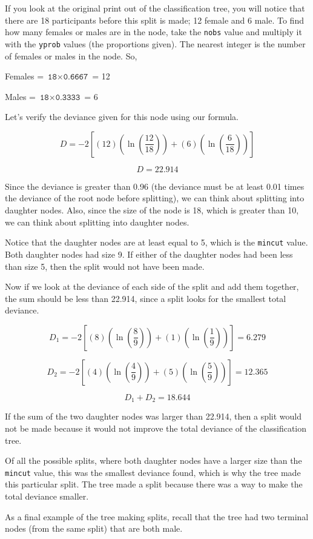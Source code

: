 \documentclass[12pt,twoside]{reedthesis}
\begin{document}
  If you look at the original print out of the classification tree, you
  will notice that there are 18 participants before this split is made; 12
  female and 6 male. To find how many females or males are in the node,
  take the \texttt{nobs} value and multiply it with the \texttt{yprob}
  values (the proportions given). The nearest integer is the number of
  females or males in the node. So,
  
  Females = \(\texttt{18}\times\texttt{0.6667}\) = 12
  
  Males = \(\texttt{18}\times\texttt{0.3333}\) = 6
  
  Let's verify the deviance given for this node using our formula.
  
  \[D = -2[(12)(\ln(\frac{12}{18})) + (6)(\ln(\frac{6}{18}))]\]
  
  \[D = 22.914\]
  
  Since the deviance is greater than 0.96 (the deviance must be at least
  0.01 times the deviance of the root node before splitting), we can think
  about splitting into daughter nodes. Also, since the size of the node is
  18, which is greater than 10, we can think about splitting into daughter
  nodes.
  
  Notice that the daughter nodes are at least equal to 5, which is the
  \texttt{mincut} value. Both daughter nodes had size 9. If either of the
  daughter nodes had been less than size 5, then the split would not have
  been made.
  
  Now if we look at the deviance of each side of the split and add them
  together, the sum should be less than 22.914, since a split looks for
  the smallest total deviance.
  
  \[D_1 = -2[(8)(\ln(\frac{8}{9})) + (1)(\ln(\frac{1}{9}))] = 6.279\]
  
  \[D_2 = -2[(4)(\ln(\frac{4}{9})) + (5)(\ln(\frac{5}{9}))] = 12.365\]
  
  \[D_1 + D_2 = 18.644\]
  
  If the sum of the two daughter nodes was larger than 22.914, then a
  split would not be made because it would not improve the total deviance
  of the classification tree.
  
  Of all the possible splits, where both daughter nodes have a larger size
  than the \texttt{mincut} value, this was the smallest deviance found,
  which is why the tree made this particular split. The tree made a split
  because there was a way to make the total deviance smaller.
  
  As a final example of the tree making splits, recall that the tree had
  two terminal nodes (from the same split) that are both male.
  
\end{document}
